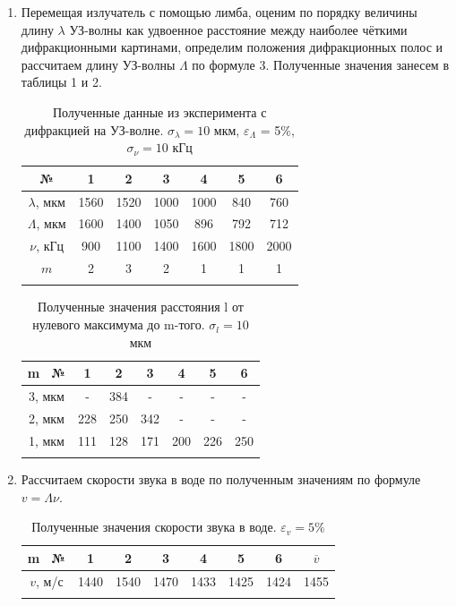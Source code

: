 \documentclass[a4paper, 12pt]{article}%
\begin{document}
	\begin{enumerate}
		\item Перемещая излучатель с помощью лимба, оценим по порядку величины длину $\lambda$ УЗ-волны как удвоенное расстояние между наиболее чёткими дифракционными картинами, определим положения дифракционных полос и рассчитаем длину УЗ-волны $\Lambda$ по формуле 3. Полученные значения занесем в таблицы 1 и 2.
		
		\begin{longtable}{|c|c|c|c|c|c|c|}
			\hline
			№              & 1    & 2    & 3    & 4    & 5    & 6    \\ \hline
			$\lambda$, мкм & 1560 & 1520 & 1000 & 1000 & 840  & 760  \\ \hline
			$\Lambda$, мкм & 1600 & 1400 & 1050 & 896  & 792  & 712  \\ \hline
			$\nu$, кГц     & 900  & 1100 & 1400 & 1600 & 1800 & 2000 \\ \hline
			$m$            & 2    & 3    & 2    & 1    & 1    & 1    \\ \hline
			\caption{Полученные данные из эксперимента с дифракцией на УЗ-волне. $\sigma_{\lambda} = 10$ мкм, $\varepsilon_{\Lambda}$ = 5\%, $\sigma_{\nu} = 10$ кГц}
		\end{longtable}
	
		\begin{longtable}{|c|c|c|c|c|c|c|}
			\hline
			m \ №  & 1   & 2   & 3 & 4 & 5  & 6    \\ \hline
			3, мкм & -   & 384 & - & - & -  & -    \\ \hline
			2, мкм & 228 & 250 & 342 & - & -  & -  \\ \hline
			1, мкм & 111 & 128 & 171 & 200 & 226 & 250 \\ \hline
			\caption{Полученные значения расстояния l от нулевого максимума до m-того. $\sigma_l = 10$ мкм}
		\end{longtable}
	
	
	\item Рассчитаем скорости звука в воде по полученным значениям по формуле $v = \Lambda \nu$. 
	
	\begin{longtable}{|c|c|c|c|c|c|c|c|}
		\hline
		m \ №  & 1 & 2 & 3 & 4 & 5 & 6  &  $\overline{v}$ \\ \hline
		$v$, м/с & 1440 & 1540 & 1470 & 1433 & 1425 & 1424 & 1455 \\ \hline
		\caption{Полученные значения скорости звука в воде. $\varepsilon_v = 5\% $}
	\end{longtable}
	

\end{enumerate}
\end{document}
